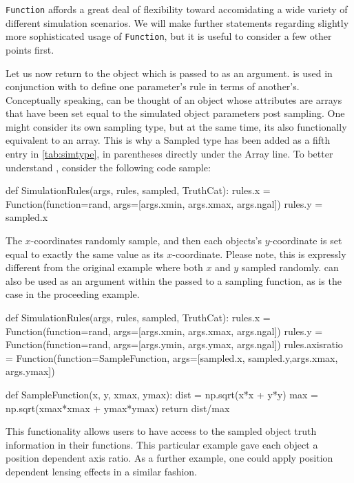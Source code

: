 \documentclass[11pt]{book}
\newcommand{\codett}[1]{\lstinline{#1}}
\begin{document}
\noindent \codett{Function} affords a great deal of flexibility toward accomidating  a wide variety of different simulation scenarios.
We will make further statements regarding slightly more sophisticated usage
of \codett{Function}, but it is useful to consider a few other points first.

Let us now return to the \simsamp{} object which is passed to \simfunc{} as an argument.
\simsamp{} is used in conjunction with \simrules{} to define one parameter's rule in terms of another's.
Conceptually speaking, \simsamp{} can be thought of an object whose attributes are arrays that 
have been set equal to the simulated object parameters post sampling.
One might consider \simsamp{} its own sampling type, but at the same time, its also functionally equivalent to an array.
This is why a Sampled type has been added as a fifth entry in \autoref{tab:simtype}, in parentheses directly under the Array line.
To better understand \simsamp{}, consider the following code sample:

\begin{code}
def SimulationRules(args, rules, sampled, TruthCat):
    rules.x = Function(function=rand, args=[args.xmin, args.xmax, args.ngal])
    rules.y = sampled.x
\end{code}

\noindent The $x$-coordinates randomly sample, and then each objects's $y$-coordinate
is set equal to exactly the same value as its $x$-coordinate.
Please note, this is expressly different from the original example where both $x$ and $y$ sampled randomly.
\simsamp{} can also be used as an argument within the \simargs{} passed to a sampling function,
as is the case in the proceeding example.

\begin{code}
def SimulationRules(args, rules, sampled, TruthCat):
    rules.x = Function(function=rand, args=[args.xmin, args.xmax, args.ngal])
    rules.y = Function(function=rand, args=[args.ymin, args.ymax, args.ngal])
    rules.axisratio = Function(function=SampleFunction, args=[sampled.x, sampled.y,args.xmax, args.ymax])

def SampleFunction(x, y, xmax, ymax):
    dist = np.sqrt(x*x + y*y)
    max = np.sqrt(xmax*xmax + ymax*ymax)
    return dist/max
\end{code}

\noindent This functionality allows users to have access to the sampled object truth
information in their functions.
This particular example gave each object a position dependent axis ratio.
As a further example, one could apply position dependent lensing effects in a similar fashion.
\end{document}
